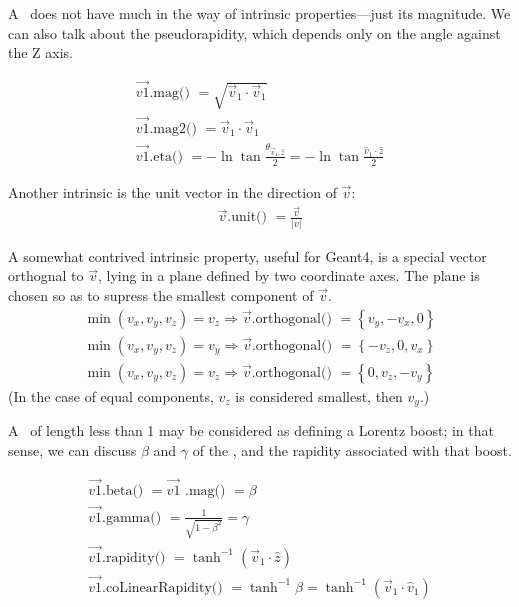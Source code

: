 A \SV\ does not have much in the way of intrinsic properties---just its
magnitude.
We can also talk about the pseudorapidity, which depends only on the angle
against the Z axis.

\begin{eqnarray}
  \vec{v1}\mbox{.mag() } = \sqrt { \vec{v}_{1} \cdot \vec{v}_{1} }
    \label{eq:mag} \\
  \vec{v1}\mbox{.mag2() } = \vec{v}_{1} \cdot \vec{v}_{1}
    \label{eq:mag2} \\
  \vec{v1}\mbox{.eta() } = 	-\ln \tan \frac {\theta_{\vec{v}_1,\hat{z}}}{2}
    = -\ln \tan \frac {\hat{v}_1 \cdot \hat{z}}{2}
    \label{eq:eta}
\end{eqnarray}

Another intrinsic is the unit vector in the direction of $\vec{v}$:
\begin{eqnarray}
  \vec{v}\mbox{.unit() } = \frac{\vec{v}}{|v|}
    \label{eq:svunit} 
\end{eqnarray}

A somewhat contrived intrinsic property, useful for Geant4, is a special 
vector orthognal to $\vec{v}$, lying in a plane defined by two coordinate 
axes.
The plane is chosen so as to supress the smallest component of $\vec{v}$.
\begin{eqnarray}
  \min( v_x, v_y, v_z ) = v_z \Longrightarrow 
		\vec{v}\mbox{.orthogonal() } = \left\{ v_y, -v_x, 0 \right\}
    \label{eq:orthogonal} \\
  \min( v_x, v_y, v_z ) = v_y \Longrightarrow 
		\vec{v}\mbox{.orthogonal() } = \left\{ -v_z, 0, v_x \right\}
    \nonumber \\
  \min( v_x, v_y, v_z ) = v_z \Longrightarrow 
		\vec{v}\mbox{.orthogonal() } = \left\{ 0, v_z, -v_y \right\}
    \nonumber 
\end{eqnarray}
(In the case of equal components, $v_z$ is considered smallest, then $v_y$.)


\noindent
A \SV\ of length less than 1 may be considered as defining a Lorentz boost;
in that sense, we can discuss $\beta$ and $\gamma$ of the \SV, and the rapidity
associated with that boost.

\begin{eqnarray}
  \vec{v1}\mbox{.beta() } = \vec{v1}\mbox{ .mag() } = \beta
    \label{eq:mag:2} \label{eq:beta} \\
  \vec{v1}\mbox{.gamma() } = \frac{1} {\sqrt {1-\beta^2 } } = \gamma
    \label{eq:gamma} \\
  \vec{v1}\mbox{.rapidity() } = \tanh^{-1} (\vec{v}_{1} \cdot \hat{z})
    \label{eq:rap} \\
  \vec{v1}\mbox{.coLinearRapidity() } = \tanh^{-1} \beta
    = \tanh^{-1} (\vec{v}_{1} \cdot \hat{v}_1)
    \label{eq:coLinRap}
\end{eqnarray}

